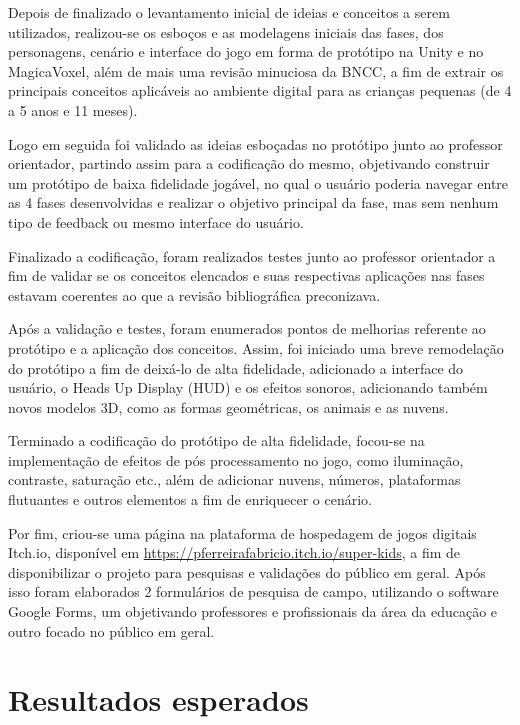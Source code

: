 \documentclass[article,12pt,openany,oneside,a4paper,english,brazil]{abntex2}
\begin{document}
Depois de finalizado o levantamento inicial de ideias e conceitos a serem utilizados, realizou-se os esboços e as modelagens iniciais das fases, dos personagens, cenário e interface do jogo em forma de protótipo na Unity e no MagicaVoxel, além de mais uma revisão minuciosa da BNCC, a fim de extrair os principais conceitos aplicáveis ao ambiente digital para as crianças pequenas (de 4 a 5 anos e 11 meses).

Logo em seguida foi validado as ideias esboçadas no protótipo junto ao professor orientador, partindo assim para a codificação do mesmo, objetivando construir um protótipo de baixa fidelidade jogável, no qual o usuário poderia navegar entre as 4 fases desenvolvidas e realizar o objetivo principal da fase, mas sem nenhum tipo de feedback ou mesmo interface do usuário.

Finalizado a codificação, foram realizados testes junto ao professor orientador a fim de validar se os conceitos elencados e suas respectivas aplicações nas fases estavam coerentes ao que a revisão bibliográfica preconizava.

Após a validação e testes, foram enumerados pontos de melhorias referente ao protótipo e a aplicação dos conceitos. Assim, foi iniciado uma breve remodelação do protótipo a fim de deixá-lo de alta fidelidade, adicionado a interface do usuário, o Heads Up Display (HUD) e os efeitos sonoros, adicionando também novos modelos 3D, como as formas geométricas, os animais e as nuvens. 

Terminado a codificação do protótipo de alta fidelidade, focou-se na implementação de efeitos de pós processamento no jogo, como iluminação, contraste, saturação etc., além de adicionar nuvens, números, plataformas flutuantes e outros elementos a fim de enriquecer o cenário.

Por fim, criou-se uma página na plataforma de hospedagem de jogos digitais Itch.io, disponível em \url{https://pferreirafabricio.itch.io/super-kids}, a fim de disponibilizar o projeto para pesquisas e validações do público em geral. Após isso foram elaborados 2 formulários de pesquisa de campo, utilizando o software Google Forms, um objetivando professores e profissionais da área da educação e outro focado no público em geral.


\section{Resultados esperados}
\label{sc:resultados}
\end{document}
